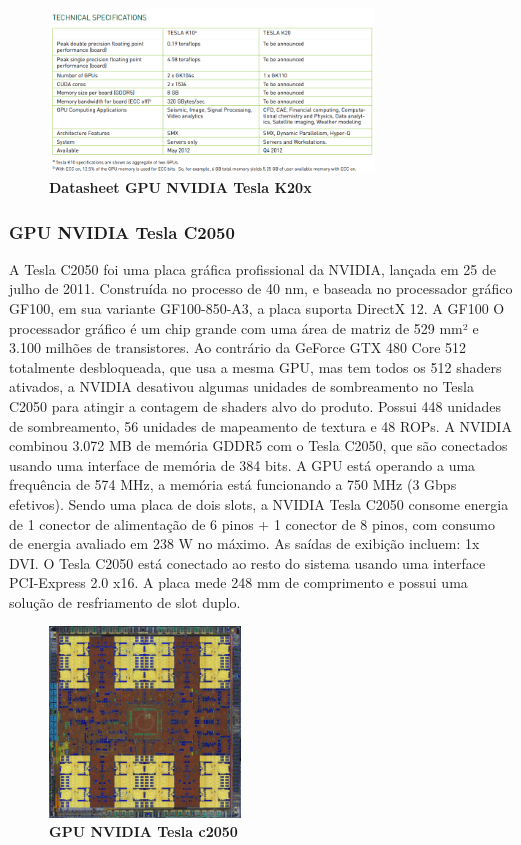 \documentclass[conference]{IEEEtran}
\begin{document}
\begin{figure}[!h]
\centerline{\includegraphics[width = 3.4in]{datak20.png}}
\caption{\textbf{Datasheet GPU NVIDIA Tesla K20x}}
\label{figAM9300}
\end{figure}

\subsubsection{GPU NVIDIA Tesla C2050}
\par A Tesla C2050 foi uma placa gráfica profissional da NVIDIA, lançada em 25 de julho de 2011. Construída no processo de 40 nm, e baseada no processador gráfico GF100, em sua variante GF100-850-A3, a placa suporta DirectX 12. A GF100 O processador gráfico é um chip grande com uma área de matriz de 529 mm² e 3.100 milhões de transistores. Ao contrário da GeForce GTX 480 Core 512 totalmente desbloqueada, que usa a mesma GPU, mas tem todos os 512 shaders ativados, a NVIDIA desativou algumas unidades de sombreamento no Tesla C2050 para atingir a contagem de shaders alvo do produto. Possui 448 unidades de sombreamento, 56 unidades de mapeamento de textura e 48 ROPs. A NVIDIA combinou 3.072 MB de memória GDDR5 com o Tesla C2050, que são conectados usando uma interface de memória de 384 bits. A GPU está operando a uma frequência de 574 MHz, a memória está funcionando a 750 MHz (3 Gbps efetivos).
Sendo uma placa de dois slots, a NVIDIA Tesla C2050 consome energia de 1 conector de alimentação de 6 pinos + 1 conector de 8 pinos, com consumo de energia avaliado em 238 W no máximo. As saídas de exibição incluem: 1x DVI. O Tesla C2050 está conectado ao resto do sistema usando uma interface PCI-Express 2.0 x16. A placa mede 248 mm de comprimento e possui uma solução de resfriamento de slot duplo.

\begin{figure}[h]
\centerline{\includegraphics[width = 2.0in]{85-die-shot.jpg}}
\caption{\textbf{GPU NVIDIA Tesla c2050}}
\label{figAM9300}
\end{figure}
\end{document}
